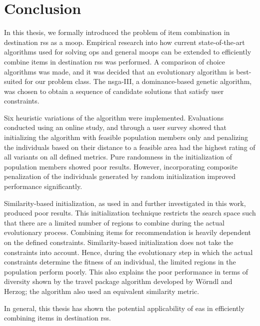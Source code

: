 
\chapter{Conclusion}\label{chapter:conclusion}
In this thesis, we formally introduced the problem of item combination in destination \glspl{rs} as a \gls{moop}. Empirical research into how current state-of-the-art algorithms used for solving \glspl{op} and general \glspl{moop} can be extended to efficiently combine items in destination \glspl{rs} was performed. A comparison of choice algorithms was made, and it was decided that an evolutionary algorithm is best-suited for our problem class. The \gls{nsga}-III, a dominance-based genetic algorithm, was chosen to obtain a sequence of candidate solutions that satisfy user constraints.


Six heuristic variations of the algorithm were implemented. Evaluations conducted using an online study, and through a user survey showed that initializing the algorithm with feasible population members only and penalizing the individuals based on their distance to a feasible area had the highest rating of all variants on all defined metrics. Pure randomness in the initialization of population members showed poor results. However, incorporating composite penalization of the individuals generated by random initialization improved performance significantly.


Similarity-based initialization, as used in \parencite{cbrecsys2014} and further investigated in this work, produced poor results. This initialization technique restricts the search space such that there are a limited number of regions to combine during the actual evolutionary process. Combining items for recommendation is heavily dependent on the defined constraints. Similarity-based initialization does not take the constraints into account. Hence, during the evolutionary step in which the actual constraints determine the fitness of an individual, the limited regions in the population perform poorly. This also explains the poor performance in terms of diversity shown by the travel package algorithm developed by Wörndl and Herzog; the algorithm also used an equivalent similarity metric.

In general, this thesis has shown the potential applicability of \glspl{ea} in efficiently combining items in destination \glspl{rs}.


